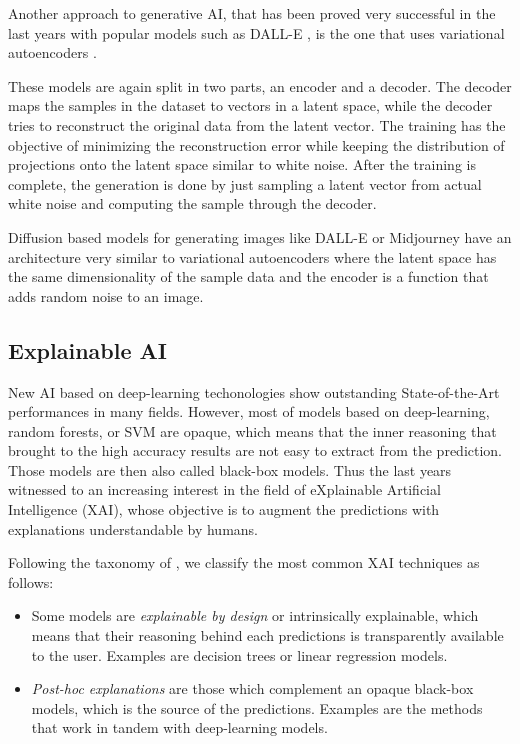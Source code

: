 \documentclass[]{marticle}
\begin{document}
Another approach to generative AI, that has been proved very successful in the last years with
popular models such as DALL-E \cite{dall-e}, is the one that uses variational autoencoders
\cite{variational-autoencoders}.

These models are again split in two parts, an encoder and a decoder. The decoder maps the samples in
the dataset to vectors in a latent space, while the decoder tries to reconstruct the original data
from the latent vector. The training has the objective of minimizing the reconstruction error while
keeping the distribution of projections onto the latent space similar to white noise. After the
training is complete, the generation is done by just sampling a latent vector from actual white
noise and computing the sample through the decoder.

Diffusion based models for generating images like DALL-E or Midjourney have an architecture very
similar to variational autoencoders where the latent space has the same dimensionality of the sample
data and the encoder is a function that adds random noise to an image.

\subsection{Explainable AI}

New AI based on deep-learning techonologies show outstanding State-of-the-Art performances in many
fields. However, most of models based on deep-learning, random forests, or SVM are opaque, which
means that the inner reasoning that brought to the high accuracy results are not easy to extract
from the prediction.  Those models are then also called black-box models. Thus the last years
witnessed to an increasing interest in the field of eXplainable Artificial Intelligence (XAI), whose
objective is to augment the predictions with explanations understandable by humans.

Following the taxonomy of \cite{xai-survey}, we classify the most common XAI techniques as follows:

\begin{itemize}
\item Some models are \textit{explainable by design} or intrinsically explainable, which means that
    their reasoning behind each predictions is transparently available to the user. Examples are
    decision trees or linear regression models.

\item \textit{Post-hoc explanations} are those which complement an opaque black-box models, which is
    the source of the predictions. Examples are the methods that work in tandem with deep-learning
    models.
\end{itemize}
\end{document}
